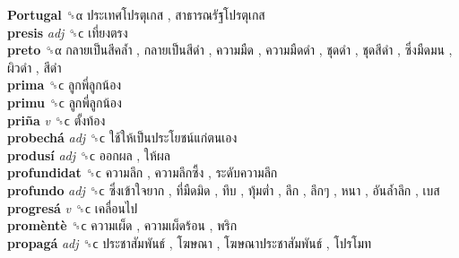 \textbf{Portugal} ␝α   ประเทศโปรตุเกส ,  สาธารณรัฐโปรตุเกส   \\
\textbf{presis} \emph{adj}  ␝ϲ   เที่ยงตรง   \\
\textbf{preto} ␝α   กลายเป็นสีคล้ำ ,  กลายเป็นสีดำ ,  ความมืด ,  ความมืดดำ ,  ชุดดำ ,  ชุดสีดำ ,  ซึ่งมืดมน ,  ผิวดำ ,  สีดำ   \\
\textbf{prima} ␝ϲ   ลูกพี่ลูกน้อง   \\
\textbf{primu} ␝ϲ   ลูกพี่ลูกน้อง   \\
\textbf{priña} \emph{v}  ␝ϲ   ตั้งท้อง   \\
\textbf{probechá} \emph{adj}  ␝ϲ   ใช้ให้เป็นประโยชน์แก่ตนเอง   \\
\textbf{produsí} \emph{adj}  ␝ϲ   ออกผล ,  ให้ผล   \\
\textbf{profundidat} ␝ϲ   ความลึก ,  ความลึกซึ้ง ,  ระดับความลึก   \\
\textbf{profundo} \emph{adj}  ␝ϲ   ซึ่งเข้าใจยาก ,  ที่มืดมิด ,  ทึบ ,  ทุ้มต่ำ ,  ลึก ,  ลึกๆ ,  หนา ,  อันล้ำลึก ,  เบส   \\
\textbf{progresá} \emph{v}  ␝ϲ   เคลื่อนไป   \\
\textbf{promèntè} ␝ϲ   ความเผ็ด ,  ความเผ็ดร้อน ,  พริก   \\
\textbf{propagá} \emph{adj}  ␝ϲ   ประชาสัมพันธ์ ,  โฆษณา ,  โฆษณาประชาสัมพันธ์ ,  โปรโมท   \\

